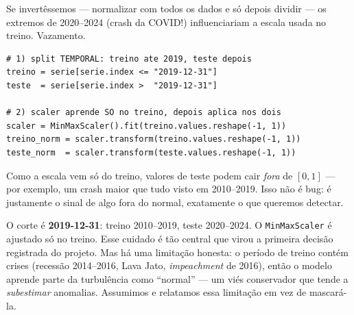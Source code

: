 Se invertêssemos --- normalizar com todos os dados e só depois dividir --- os
extremos de 2020--2024 (crash da COVID!) influenciariam a escala usada no
treino. Vazamento.

\begin{lstlisting}[caption={Split temporal antes do scaler (resumo do pipeline do projeto).}]
# 1) split TEMPORAL: treino ate 2019, teste depois
treino = serie[serie.index <= "2019-12-31"]
teste  = serie[serie.index >  "2019-12-31"]

# 2) scaler aprende SO no treino, depois aplica nos dois
scaler = MinMaxScaler().fit(treino.values.reshape(-1, 1))
treino_norm = scaler.transform(treino.values.reshape(-1, 1))
teste_norm  = scaler.transform(teste.values.reshape(-1, 1))
\end{lstlisting}

\begin{intuicao}
Como a escala vem só do treino, valores de teste podem cair \emph{fora} de
$[0,1]$ --- por exemplo, um crash maior que tudo visto em 2010--2019. Isso não é
bug: é justamente o sinal de algo fora do normal, exatamente o que queremos
detectar.
\end{intuicao}

\begin{naprat}
O corte é \textbf{2019-12-31}: treino 2010--2019, teste 2020--2024. O
\texttt{MinMaxScaler} é ajustado só no treino. Esse cuidado é tão central que
virou a primeira decisão registrada do projeto. Mas há uma limitação honesta:
o período de treino contém crises (recessão 2014--2016, Lava Jato, \emph{impeachment}
de 2016), então o modelo aprende parte da turbulência como ``normal'' --- um
viés conservador que tende a \emph{subestimar} anomalias. Assumimos e relatamos
essa limitação em vez de mascará-la.
\end{naprat}
